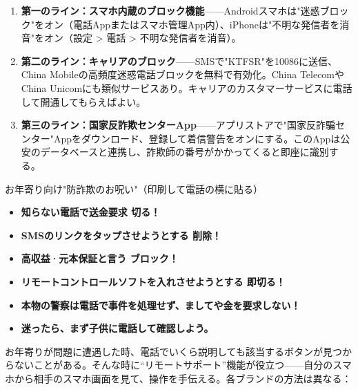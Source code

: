 
\begin{enumerate}
  \item \textbf{第一のライン：スマホ内蔵のブロック機能}——Androidスマホは"迷惑ブロック"をオン（電話Appまたはスマホ管理App内）、iPhoneは"不明な発信者を消音"をオン（設定 > 電話 > 不明な発信者を消音）。
  \item \textbf{第二のライン：キャリアのブロック}——SMSで"KTFSR"を10086に送信、China Mobileの高頻度迷惑電話ブロックを無料で有効化。China TelecomやChina Unicomにも類似サービスあり。キャリアのカスタマーサービスに電話して開通してもらえばよい。
  \item \textbf{第三のライン：国家反詐欺センターApp}——アプリストアで"国家反詐騙センター"Appをダウンロード、登録して着信警告をオンにする。このAppは公安のデータベースと連携し、詐欺師の番号がかかってくると即座に識別する。
\end{enumerate}

\begin{tcbwarn}{お年寄り向け"防詐欺のお呪い"（印刷して電話の横に貼る）}
\begin{itemize}
  \item \textbf{知らない電話で送金要求 切る！}
  \item \textbf{SMSのリンクをタップさせようとする 削除！}
  \item \textbf{高収益·元本保証と言う ブロック！}
  \item \textbf{リモートコントロールソフトを入れさせようとする 即切る！}
  \item \textbf{本物の警察は電話で事件を処理せず、ましてや金を要求しない！}
  \item \textbf{迷ったら、まず子供に電話して確認しよう。}
\end{itemize}

\end{tcbwarn}


お年寄りが問題に遭遇した時、電話でいくら説明しても該当するボタンが見つからないことがある。そんな時に“リモートサポート”機能が役立つ——自分のスマホから相手のスマホ画面を見て、操作を手伝える。各ブランドの方法は異なる：

